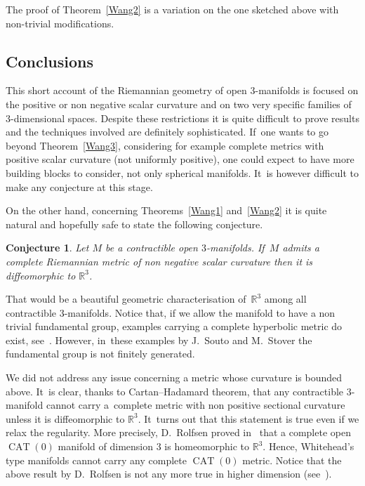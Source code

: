 \documentclass[pdftex]{sigma}
\numberwithin{equation}{section}
\newtheorem{Conjecture}[theor]{Conjecture}
\newcommand{\CAT}{\operatorname{CAT}}
\begin{document}
The proof of Theorem~\ref{Wang2} is a variation on the one sketched above
with non-trivial modifications.

\subsection{Conclusions}

This short account of the Riemannian geometry of open $3$-manifolds is focused on the positive or non negative scalar curvature and on two very specific families of~$3$-dimensional spaces. Despite these restrictions it is quite difficult to prove results and the techniques involved are definitely sophisticated. If~one wants to go beyond Theorem~\ref{Wang3}, considering for example complete metrics with positive scalar curvature (not uniformly positive), one could expect to have more building blocks to consider, not only spherical manifolds. It~is however difficult to make any conjecture at this stage.

On the other hand, concerning Theorems~\ref{Wang1} and~\ref{Wang2} it is quite natural and hopefully safe to state the following conjecture.

\begin{Conjecture}
Let $M$ be a contractible open $3$-manifolds. If~$M$ admits a complete Riemannian metric of non negative scalar curvature then it is diffeomorphic
to $\mathbb{R}^{3}$.
\end{Conjecture}

That would be a beautiful geometric characterisation of~$\mathbb{R}^{3}$ among all contractible $3$-mani\-folds. Notice that, if we allow the manifold to have a non trivial fundamental group, examples carrying a complete hyperbolic metric do exist, see~\cite{Sou-Sto}. However, in~these examples by J.~Souto and M.~Stover the fundamental group is not finitely generated.

We did not address any issue concerning a metric whose curvature is bounded above. It~is clear, thanks to Cartan--Hadamard theorem, that any contractible $3$-manifold cannot carry a~complete metric with non positive sectional curvature unless it is diffeomorphic to $\mathbb{R}^{3}$. It~turns
out that this statement is true even if we relax the regularity. More precisely, D.~Rolfsen proved in~\cite{Rolf} that a complete open $\CAT(0)$ manifold of dimension $3$ is homeomorphic to $\mathbb{R}^{3}$. Hence, Whitehead's type manifolds cannot carry any complete $\CAT(0)$ metric. Notice
that the above result by D.~Rolfsen is not any more true in higher dimension (see~\cite{D-J}).
\end{document}
